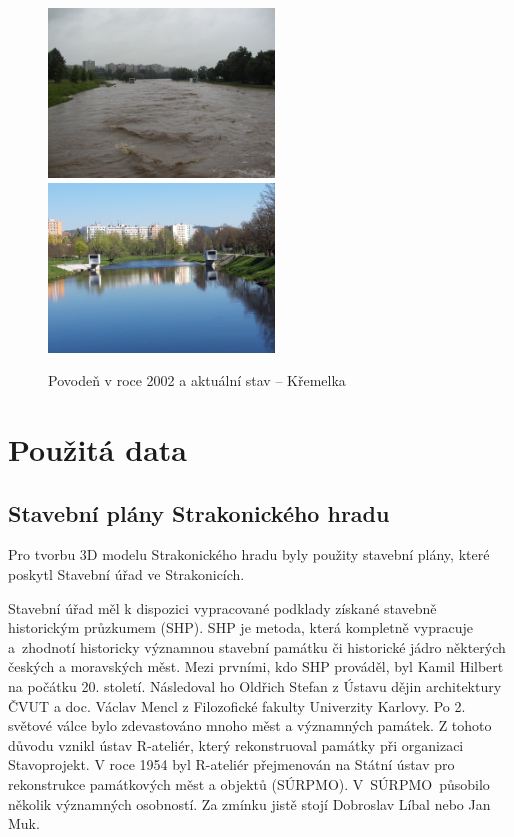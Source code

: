 \documentclass[thesis=M,czech]{FITthesis}[2012/06/26]
\begin{document}
\begin{figure}[h!]
\centering
\includegraphics[width=6cm]{pics/povoden4.jpg}
\includegraphics[width=6cm]{pics/povoden4_2019.jpg}
\caption{Povodeň v roce 2002 a aktuální stav – Křemelka}
\label{obr:povoden_hrad}
\end{figure}

\chapter{Použitá data}
\section{Stavební plány Strakonického hradu}
Pro tvorbu 3D modelu Strakonického hradu byly použity stavební plány, které poskytl Stavební úřad ve Strakonicích. 

Stavební úřad měl k dispozici vypracované podklady získané stavebně historickým průzkumem (SHP). SHP je metoda, která kompletně vypracuje a~zhodnotí historicky významnou stavební památku či historické jádro některých českých a moravských měst. Mezi prvními, kdo SHP prováděl, byl Kamil Hilbert na počátku 20. století. Následoval ho Oldřich Stefan z Ústavu dějin architektury ČVUT a doc. Václav Mencl z Filozofické fakulty Univerzity Karlovy. Po 2. světové válce bylo zdevastováno mnoho měst a významných památek. Z tohoto důvodu vznikl ústav R-ateliér, který rekonstruoval památky při organizaci Stavoprojekt. V roce 1954 byl R-ateliér přejmenován na Státní ústav pro rekonstrukce památkových měst a objektů (SÚRPMO). V~\mbox{SÚRPMO}~působilo několik významných osobností. Za zmínku jistě stojí Dobroslav Líbal nebo Jan Muk. 
\end{document}
